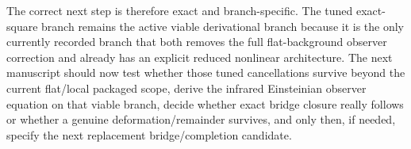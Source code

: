 \documentclass[11pt]{article}
\begin{document}
The correct next step is therefore exact and branch-specific. The tuned exact-square branch remains the active viable derivational branch because it is the only currently recorded branch that both removes the full flat-background observer correction and already has an explicit reduced nonlinear architecture. The next manuscript should now test whether those tuned cancellations survive beyond the current flat/local packaged scope, derive the infrared Einsteinian observer equation on that viable branch, decide whether exact bridge closure really follows or whether a genuine deformation/remainder survives, and only then, if needed, specify the next replacement bridge/completion candidate.
\end{document}
